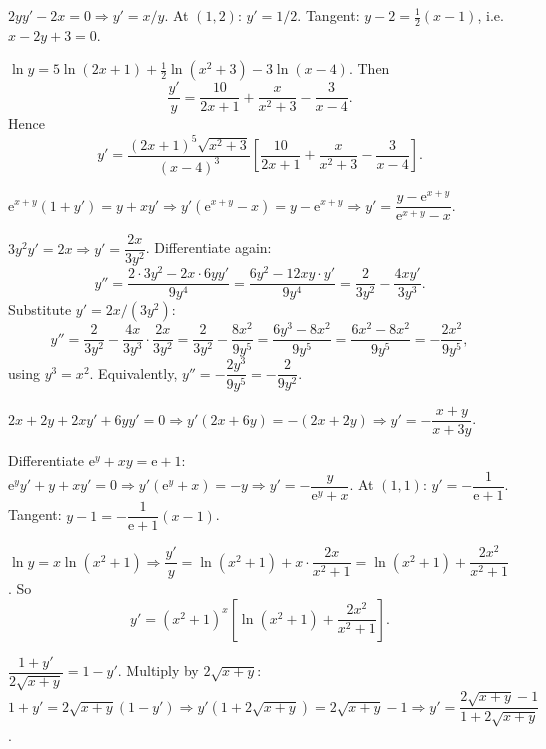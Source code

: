 \begin{solutions}
  \item $2yy'-2x=0\Rightarrow y'=x/y$. At $(1,2)$: $y'=1/2$. Tangent:
        $y-2=\tfrac12(x-1)$, i.e.\ $x-2y+3=0$.

  \item $\ln y=5\ln(2x+1)+\tfrac12\ln(x^{2}+3)-3\ln(x-4)$. Then
        \[
          \frac{y'}{y}=\frac{10}{2x+1}+\frac{x}{x^{2}+3}-\frac{3}{x-4} .
        \]
        Hence
        \[
          y'=\frac{(2x+1)^{5}\sqrt{x^{2}+3}}{(x-4)^{3}}
             \left[\frac{10}{2x+1}+\frac{x}{x^{2}+3}-\frac{3}{x-4}\right] .
        \]

  \item $\mathrm{e}^{x+y}(1+y')=y+xy'\Rightarrow
        y'(\mathrm{e}^{x+y}-x)=y-\mathrm{e}^{x+y}\Rightarrow
        y'=\dfrac{y-\mathrm{e}^{x+y}}{\mathrm{e}^{x+y}-x}$.

  \item $3y^{2}y'=2x\Rightarrow y'=\dfrac{2x}{3y^{2}}$. Differentiate
        again:
        \[
          y''=\frac{2\cdot 3y^{2}-2x\cdot 6yy'}{9y^{4}}
             =\frac{6y^{2}-12xy\cdot y'}{9y^{4}}
             =\frac{2}{3y^{2}}-\frac{4xy'}{3y^{3}} .
        \]
        Substitute $y'=2x/(3y^{2})$:
        \[
          y''=\frac{2}{3y^{2}}-\frac{4x}{3y^{3}}\cdot\frac{2x}{3y^{2}}
             =\frac{2}{3y^{2}}-\frac{8x^{2}}{9y^{5}}
             =\frac{6y^{3}-8x^{2}}{9y^{5}}
             =\frac{6x^{2}-8x^{2}}{9y^{5}}=-\frac{2x^{2}}{9y^{5}},
        \]
        using $y^{3}=x^{2}$. Equivalently, $y''=-\dfrac{2y^{3}}{9y^{5}}
        =-\dfrac{2}{9y^{2}}$.

  \item $2x+2y+2xy'+6yy'=0\Rightarrow y'(2x+6y)=-(2x+2y)\Rightarrow
        y'=-\dfrac{x+y}{x+3y}$.

  \item Differentiate $\mathrm{e}^{y}+xy=\mathrm{e}+1$:
        $\mathrm{e}^{y}y'+y+xy'=0\Rightarrow y'(\mathrm{e}^{y}+x)=-y
        \Rightarrow y'=-\dfrac{y}{\mathrm{e}^{y}+x}$. At $(1,1)$:
        $y'=-\dfrac{1}{\mathrm{e}+1}$. Tangent:
        $y-1=-\dfrac{1}{\mathrm{e}+1}(x-1)$.

  \item $\ln y=x\ln(x^{2}+1)\Rightarrow\dfrac{y'}{y}=\ln(x^{2}+1)
        +x\cdot\dfrac{2x}{x^{2}+1}=\ln(x^{2}+1)+\dfrac{2x^{2}}{x^{2}+1}$.
        So
        \[
          y'=(x^{2}+1)^{x}\left[\ln(x^{2}+1)+\frac{2x^{2}}{x^{2}+1}\right] .
        \]

  \item $\dfrac{1+y'}{2\sqrt{x+y}}=1-y'$. Multiply by $2\sqrt{x+y}$:
        $1+y'=2\sqrt{x+y}(1-y')\Rightarrow y'(1+2\sqrt{x+y})
        =2\sqrt{x+y}-1\Rightarrow y'=\dfrac{2\sqrt{x+y}-1}{1+2\sqrt{x+y}}$.


\end{solutions}

